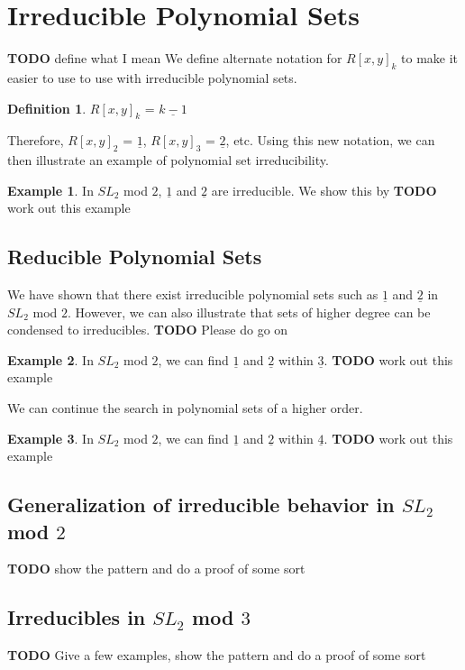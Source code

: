\documentclass[a4paper,draft]{amsproc}
\theoremstyle{plain}
\theoremstyle{definition}
\newtheorem{exm}{Example}[section]
\newtheorem{dfn}{Definition}[section]
\theoremstyle{remark}
\numberwithin{equation}{section}
\begin{document}
\section{Irreducible Polynomial Sets}
\textbf{TODO} define what I mean
We define alternate notation for $R[x,y]_{k}$ to make it easier to use to use with irreducible polynomial sets. 
\begin{dfn}
$R[x,y]_{k}$ = $\underline{k-1}$
\end{dfn} 
Therefore, $R[x,y]_{2}$ = $\underline{1}$, $R[x,y]_{3}$ = $\underline{2}$, etc. Using this new notation, we can then illustrate an example of polynomial set irreducibility. 

\begin{exm}
In  $SL_{2}$ mod $2$, $\underline{1}$ and $\underline{2}$ are irreducible. We show this by
\textbf{TODO} work out this example
\end{exm}

\subsection{Reducible Polynomial Sets}
We have shown that there exist irreducible polynomial sets such as $\underline{1}$ and $\underline{2}$ in  $SL_{2}$ mod $2$. However, we can also illustrate that sets of higher degree can be condensed to irreducibles. 
\textbf{TODO} Please do go on
\begin{exm}
In  $SL_{2}$ mod $2$, we can find $\underline{1}$ and $\underline{2}$ within $\underline{3}$. 
\textbf{TODO} work out this example
\end{exm}

We can continue the search in polynomial sets of a higher order. 
\begin{exm}
In  $SL_{2}$ mod $2$, we can find $\underline{1}$ and $\underline{2}$ within $\underline{4}$. 
\textbf{TODO} work out this example
\end{exm}

\subsection{Generalization of irreducible behavior in $SL_{2}$ mod $2$ }
\textbf{TODO} show the pattern and do a proof of some sort

\subsection{Irreducibles in $SL_{2}$ mod $3$}
\textbf{TODO} Give a few examples, show the pattern and do a proof of some sort
\end{document}
